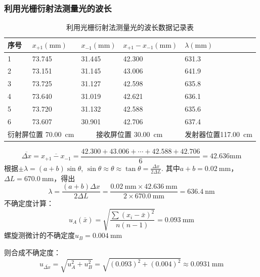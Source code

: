 \documentclass[]{../../templates/Report}%
\begin{document}
\begin{fullreportonly}
\subsubsection{利用光栅衍射法测量光的波长}
\begin{table}[H]
\centering
\caption{利用光栅衍射法测量光的波长数据记录表}
\label{tab:lambda}
\begin{tabular}{|ll|ll|l|}
\hline
\multicolumn{1}{|l|}{序号} & $x_{+1}(\si{\mm})$ & \multicolumn{1}{l|}{$x_{-1}(\si{\mm})$} & $x_{+1} - x_{-1}(\si{\mm})$ & $\lambda(\si{\mm})$                        \\ \hline
\multicolumn{1}{|l|}{1} & 73.745 & \multicolumn{1}{l|}{31.445} & 42.300 & 631.3 \\ \hline
\multicolumn{1}{|l|}{2} & 73.151 & \multicolumn{1}{l|}{31.145} & 43.006 & 641.9 \\ \hline
\multicolumn{1}{|l|}{3} & 73.725 & \multicolumn{1}{l|}{31.127} & 42.598 & 635.8 \\ \hline
\multicolumn{1}{|l|}{4} & 73.640 & \multicolumn{1}{l|}{31.019} & 42.621 & 636.1 \\ \hline
\multicolumn{1}{|l|}{5} & 73.720 & \multicolumn{1}{l|}{31.132} & 42.588 & 635.6 \\ \hline
\multicolumn{1}{|l|}{6} & 73.607 & \multicolumn{1}{l|}{30.901} & 42.706 & 637.4 \\ \hline
\multicolumn{2}{|c|}{衍射屏位置 \SI{70.00}{\cm}}   & \multicolumn{2}{c|}{接收屏位置 \SI{30.00}{\cm}}                            & \multicolumn{1}{c|}{发射器位置\SI{117.00}{\cm}} \\ \hline
\end{tabular}%
\end{table}
\[
\overline{\Delta x} = \overline{x_{+1} - x_{-1}} = \frac{42.300 + 43.006 + \cdots + 42.588 + 42.706}{6} = 42.636 \si{\mm}
\]
根据$\pm \lambda = (a + b)\sin \theta$, $\sin \theta \approx \theta \approx \tan \theta = \frac{\Delta x}{2\Delta L}$. 其中$a + b = \SI{0.02}{\mm}$，$\Delta L = \SI{670.0}{\mm}$，得出
\[
\lambda = \frac{(a + b)\Delta x}{2\Delta L} = \frac{\SI{0.02}{\mm} \times \SI{42.636}{\mm}}{2 \times \SI{670.0}{\mm}} = \SI{636.4}{\nm}
\]
不确定度计算：
\[
u_A(\bar{x}) = \sqrt{\frac{\sum{(x_i - \bar{x})^2}}{n(n-1)}} = \SI{0.093}{\mm}
\]
螺旋测微计的不确定度$u_B = \SI{0.004}{\mm}$

则合成不确定度：
\[u_{\bar{\Delta x}} = \sqrt{u_A^2 + u_B^2} = \sqrt{(0.093)^2 + (0.004)^2} \approx \SI{0.0931}{\mm}\]


\end{fullreportonly}
\end{document}
